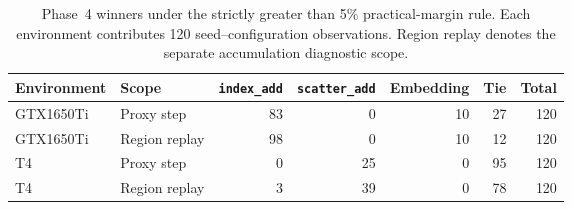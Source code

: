\begin{table}[!htbp]
\centering\small
\caption{Phase~4 winners under the strictly greater than 5\% practical-margin rule. Each environment contributes 120 seed--configuration observations. Region replay denotes the separate accumulation diagnostic scope.}
\label{tab:phase4-winner-counts}
\setlength{\tabcolsep}{3pt}
\renewcommand{\arraystretch}{1.12}
\begin{tabular}{llrrrrr}
\toprule
Environment & Scope & \texttt{index\_add} & \texttt{scatter\_add} & Embedding & Tie & Total \\
\midrule
GTX1650Ti & Proxy step & 83 & 0 & 10 & 27 & 120 \\
GTX1650Ti & Region replay & 98 & 0 & 10 & 12 & 120 \\
T4 & Proxy step & 0 & 25 & 0 & 95 & 120 \\
T4 & Region replay & 3 & 39 & 0 & 78 & 120 \\
\bottomrule
\end{tabular}
\end{table}